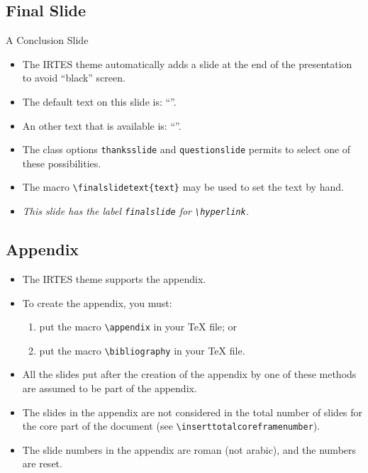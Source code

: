 \documentclass[english,circlenumberstyle]{irtesbeamer}
\begin{document}
\subsection{Final Slide}
\begin{frame}{A Conclusion Slide}
	\begin{itemize}
	\item The IRTES theme automatically adds a slide at the end of the presentation to avoid ``black'' screen.
	\item The default text on this slide is: ``''.
	\item An other text that is available is: ``''.
	\item The class options \texttt{thanksslide} and \texttt{questionslide} permits to select one of these possibilities.
	\item The macro \texttt{{\textbackslash}finalslidetext\{text\}} may be used to set the text by hand.
	\item \emph{This slide has the label \texttt{finalslide} for \texttt{{\textbackslash}hyperlink}.}
	\end{itemize}
\end{frame}

\subsection{Appendix}
\begin{frame}{\subsecname}
	\begin{itemize}
	\item The IRTES theme supports the appendix.
	\item To create the appendix, you must:
		\begin{enumerate}
		\item put the macro \texttt{{\textbackslash}appendix} in your {\TeX} file; or
		\item put the macro \texttt{{\textbackslash}bibliography} in your {\TeX} file.
		\end{enumerate}
	\item All the slides put after the creation of the appendix by one of these methods are assumed to be part of the appendix.
	\item The slides in the appendix are not considered in the total number of slides for the core part of the document (see \texttt{{\textbackslash}inserttotalcoreframenumber}).
	\item The slide numbers in the appendix are roman (not arabic), and the numbers are reset.
	\end{itemize}
\end{frame}
\end{document}
